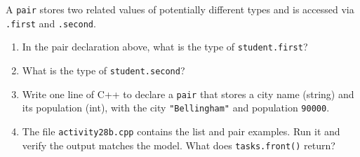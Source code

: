   \Q A {\tt pair} stores two related values of potentially different
    types and is accessed via {\tt .first} and {\tt .second}.
    \begin{enumerate}
      \itemsep 10pt
      \item In the pair declaration above, what is the type of
        {\tt student.first}?
        \hfill{}

      \item What is the type of {\tt student.second}?
        \hfill{}

      \item Write one line of C++ to declare a {\tt pair} that stores
        a city name (string) and its population (int), with the city
        {\tt "Bellingham"} and population {\tt 90000}.
        \begin{answer}[0.5in]
        \end{answer}

      \item The file {\tt activity28b.cpp} contains the list and pair
        examples.  Run it and verify the output matches the model.
        What does {\tt tasks.front()} return?
        \hfill{}
    \end{enumerate}

